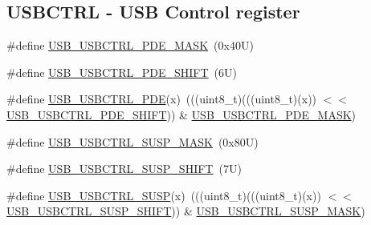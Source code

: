 \subsection*{U\+S\+B\+C\+T\+RL -\/ U\+SB Control register}
\begin{DoxyCompactItemize}
\item 
\#define \mbox{\hyperlink{group___u_s_b___register___masks_ga7fb8345a32022ec5df5129278d1aed30}{U\+S\+B\+\_\+\+U\+S\+B\+C\+T\+R\+L\+\_\+\+P\+D\+E\+\_\+\+M\+A\+SK}}~(0x40\+U)
\item 
\#define \mbox{\hyperlink{group___u_s_b___register___masks_gaaf556df66acd4f6ff2bc1f4fad1a05ed}{U\+S\+B\+\_\+\+U\+S\+B\+C\+T\+R\+L\+\_\+\+P\+D\+E\+\_\+\+S\+H\+I\+FT}}~(6\+U)
\item 
\#define \mbox{\hyperlink{group___u_s_b___register___masks_ga6a35a726a9f00f3e8762aa76a95e4682}{U\+S\+B\+\_\+\+U\+S\+B\+C\+T\+R\+L\+\_\+\+P\+DE}}(x)~(((uint8\+\_\+t)(((uint8\+\_\+t)(x)) $<$$<$ \mbox{\hyperlink{group___u_s_b___register___masks_gaaf556df66acd4f6ff2bc1f4fad1a05ed}{U\+S\+B\+\_\+\+U\+S\+B\+C\+T\+R\+L\+\_\+\+P\+D\+E\+\_\+\+S\+H\+I\+FT}})) \& \mbox{\hyperlink{group___u_s_b___register___masks_ga7fb8345a32022ec5df5129278d1aed30}{U\+S\+B\+\_\+\+U\+S\+B\+C\+T\+R\+L\+\_\+\+P\+D\+E\+\_\+\+M\+A\+SK}})
\item 
\#define \mbox{\hyperlink{group___u_s_b___register___masks_gac65859ca12bfe997afc67545c8b1a052}{U\+S\+B\+\_\+\+U\+S\+B\+C\+T\+R\+L\+\_\+\+S\+U\+S\+P\+\_\+\+M\+A\+SK}}~(0x80\+U)
\item 
\#define \mbox{\hyperlink{group___u_s_b___register___masks_ga44772d68648a57e6341ceec7fd5268f3}{U\+S\+B\+\_\+\+U\+S\+B\+C\+T\+R\+L\+\_\+\+S\+U\+S\+P\+\_\+\+S\+H\+I\+FT}}~(7\+U)
\item 
\#define \mbox{\hyperlink{group___u_s_b___register___masks_gacf465e2b204f5bb95e476574c35dd74a}{U\+S\+B\+\_\+\+U\+S\+B\+C\+T\+R\+L\+\_\+\+S\+U\+SP}}(x)~(((uint8\+\_\+t)(((uint8\+\_\+t)(x)) $<$$<$ \mbox{\hyperlink{group___u_s_b___register___masks_ga44772d68648a57e6341ceec7fd5268f3}{U\+S\+B\+\_\+\+U\+S\+B\+C\+T\+R\+L\+\_\+\+S\+U\+S\+P\+\_\+\+S\+H\+I\+FT}})) \& \mbox{\hyperlink{group___u_s_b___register___masks_gac65859ca12bfe997afc67545c8b1a052}{U\+S\+B\+\_\+\+U\+S\+B\+C\+T\+R\+L\+\_\+\+S\+U\+S\+P\+\_\+\+M\+A\+SK}})
\end{DoxyCompactItemize}
